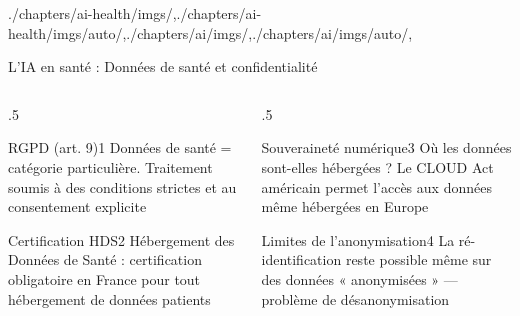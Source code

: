 \begin{graphicspathcontext}{{./chapters/ai-health/imgs/},{./chapters/ai-health/imgs/auto/},{./chapters/ai/imgs/},{./chapters/ai/imgs/auto/},\old}

\begin{frame}[t]{{L'IA en santé :} Données de santé et confidentialité}
	\footnotesize
	\begin{columns}
		\begin{column}{.5\linewidth}
			\vspace{.2cm}
			\begin{rightanchorblock}{RGPD (art. 9)}{1}
				Données de santé = catégorie particulière. Traitement soumis à des conditions strictes et au consentement explicite
			\end{rightanchorblock}
			\begin{rightanchorblock}{Certification HDS}{2}
				Hébergement des Données de Santé : certification obligatoire en France pour tout hébergement de données patients
			\end{rightanchorblock}
		\end{column}
		\begin{column}{.5\linewidth}
			\begin{rightanchorblock}{Souveraineté numérique}{3}
				Où les données sont-elles hébergées ? Le CLOUD Act américain permet l'accès aux données même hébergées en Europe
			\end{rightanchorblock}
			\begin{rightanchorblock}{Limites de l'anonymisation}{4}
				La ré-identification reste possible même sur des données « anonymisées » --- problème de désanonymisation
			\end{rightanchorblock}
		\end{column}
	\end{columns}
	\normalsize
\end{frame}


\end{graphicspathcontext}
